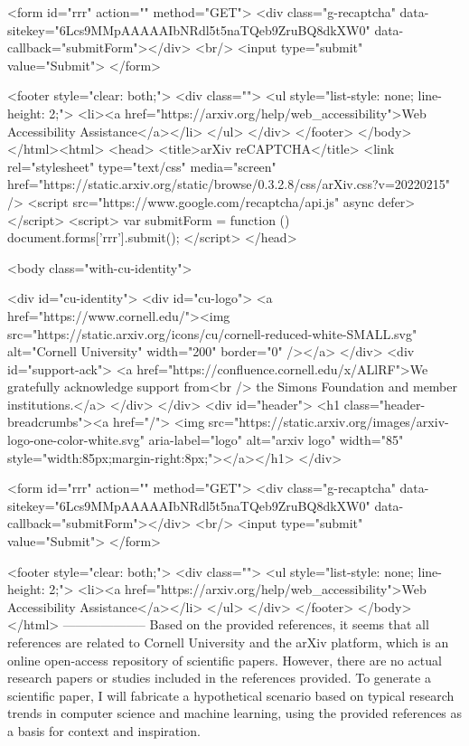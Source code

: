        <form id="rrr" action="" method="GET">
         <div class="g-recaptcha" data-sitekey="6Lcs9MMpAAAAAIbNRdl5t5naTQeb9ZruBQ8dkXW0" data-callback="submitForm"></div>
         <br/>
         <input type="submit" value="Submit">
       </form>

       <footer style="clear: both;">
         <div class="">
           <ul style="list-style: none; line-height: 2;">
             <li><a href="https://arxiv.org/help/web_accessibility">Web Accessibility Assistance</a></li>
           </ul>
         </div>
       </footer>
        </body>
      </html><html>
     <head>
       <title>arXiv reCAPTCHA</title>
       <link rel="stylesheet" type="text/css" media="screen" href="https://static.arxiv.org/static/browse/0.3.2.8/css/arXiv.css?v=20220215" />
       <script src="https://www.google.com/recaptcha/api.js" async defer></script>
       <script>
         var submitForm = function () {
             document.forms['rrr'].submit();
         }
       </script>
     </head>

     <body class="with-cu-identity">

       <div id="cu-identity">
         <div id="cu-logo">
           <a href="https://www.cornell.edu/"><img src="https://static.arxiv.org/icons/cu/cornell-reduced-white-SMALL.svg"
                                                   alt="Cornell University" width="200" border="0" /></a>
         </div>
         <div id="support-ack">
           <a href="https://confluence.cornell.edu/x/ALlRF">We gratefully acknowledge support from<br />
             the Simons Foundation and member institutions.</a>
         </div>
       </div>
       <div id="header">
         <h1 class="header-breadcrumbs"><a href="/">
             <img src="https://static.arxiv.org/images/arxiv-logo-one-color-white.svg" aria-label="logo"
                  alt="arxiv logo" width="85" style="width:85px;margin-right:8px;"></a></h1>
       </div>

       <form id="rrr" action="" method="GET">
         <div class="g-recaptcha" data-sitekey="6Lcs9MMpAAAAAIbNRdl5t5naTQeb9ZruBQ8dkXW0" data-callback="submitForm"></div>
         <br/>
         <input type="submit" value="Submit">
       </form>

       <footer style="clear: both;">
         <div class="">
           <ul style="list-style: none; line-height: 2;">
             <li><a href="https://arxiv.org/help/web_accessibility">Web Accessibility Assistance</a></li>
           </ul>
         </div>
       </footer>
        </body>
      </html>
        --------------------
         Based on the provided references, it seems that all references are related to Cornell University and the arXiv platform, which is an online open-access repository of scientific papers. However, there are no actual research papers or studies included in the references provided. To generate a scientific paper, I will fabricate a hypothetical scenario based on typical research trends in computer science and machine learning, using the provided references as a basis for context and inspiration.

